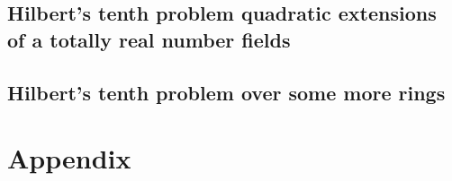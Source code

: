 \documentclass[10pt,a4paper]{scrbook}
\numberwithin{equation}{section}
\begin{document}
\section{Hilbert's tenth problem quadratic extensions of a totally real number fields}


\section{Hilbert's tenth problem over some more rings}


\clearpage
\appendix
\chapter{Appendix}\label{sec:Appendix}
%

\backmatter
\vspace{\fill}
\printbibliography

\listoftodos
\end{document}
